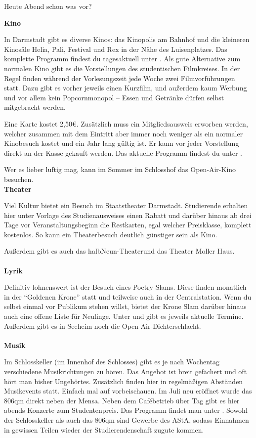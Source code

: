{Heute Abend schon was vor?
}{
    \textbf{Kino}

    In Darmstadt gibt es diverse Kinos: das Kinopolis am Bahnhof und die kleineren Kinosäle Helia, Pali, Festival und Rex in der Nähe des Luisenplatzes. Das komplette Programm findest du tagesaktuell unter  \footnotemark[1].
    Als gute Alternative zum normalen Kino gibt es die Vorstellungen des studentischen Filmkreises. In der Regel finden während der Vorlesungszeit jede Woche zwei Filmvorführungen statt. Dazu gibt es vorher jeweils einen Kurzfilm, und außerdem kaum Werbung und vor allem kein Popcornmonopol – Essen und Getränke dürfen selbst mitgebracht werden.

    Eine Karte kostet 2,50\euro. Zusätzlich muss ein Mitgliedsausweis erworben werden, welcher zusammen mit dem Eintritt aber immer noch weniger als ein normaler Kinobesuch kostet und ein Jahr lang gültig ist. Er kann vor jeder Vorstellung direkt an der Kasse gekauft werden. Das aktuelle Programm findest du unter \footnotemark[2].

    Wer es lieber luftig mag, kann im Sommer im Schlosshof das Open-Air-Kino besuchen.\\

    \textbf{Theater}

    Viel Kultur bietet ein Besuch im Staatstheater Darmstadt. Studierende erhalten hier unter Vorlage des Studienausweises einen Rabatt und darüber hinaus ab drei Tage vor Veranstaltungsbeginn die Restkarten, egal welcher Preisklasse, komplett kostenlos. So kann ein Theaterbesuch deutlich günstiger sein als Kino.

    Außerdem gibt es auch das halbNeun-Theater\footnotemark[3] und das Theater Moller Haus\footnotemark[4].
    \\\\
    \textbf{Lyrik}

    Definitiv lohnenswert ist der Besuch eines Poetry Slams. Diese finden monatlich in der "`Goldenen Krone"' statt und teilweise auch in der Centralstation. Wenn du selbst einmal vor Publikum stehen willst, bietet der Krone Slam darüber hinaus auch eine offene Liste für Neulinge.
    Unter \footnotemark[5] und \footnotemark[6] gibt es jeweils aktuelle Termine. Außerdem gibt es in Seeheim noch die Open-Air-Dichterschlacht.
    \\\\
    \textbf{Musik}

    Im Schlosskeller (im Innenhof des Schlosses) gibt es je nach Wochentag verschiedene Musikrichtungen zu hören. Das Angebot ist breit gefächert und oft hört man bisher Ungehörtes. Zusätzlich finden hier in regelmäßigen Abständen Musikevents statt. Einfach mal auf \footnotemark[7] vorbeischauen.
    Im Juli neu eröffnet wurde das 806qm direkt neben der Mensa. Neben dem Caf\'ebetrieb über Tag gibt es hier abends Konzerte zum Studentenpreis. Das Programm findet man unter \footnotemark[8].
    Sowohl der Schlosskeller als auch das 806qm sind Gewerbe des AStA, sodass Einnahmen in gewissen Teilen wieder der Studierendenschaft zugute kommen.

}
